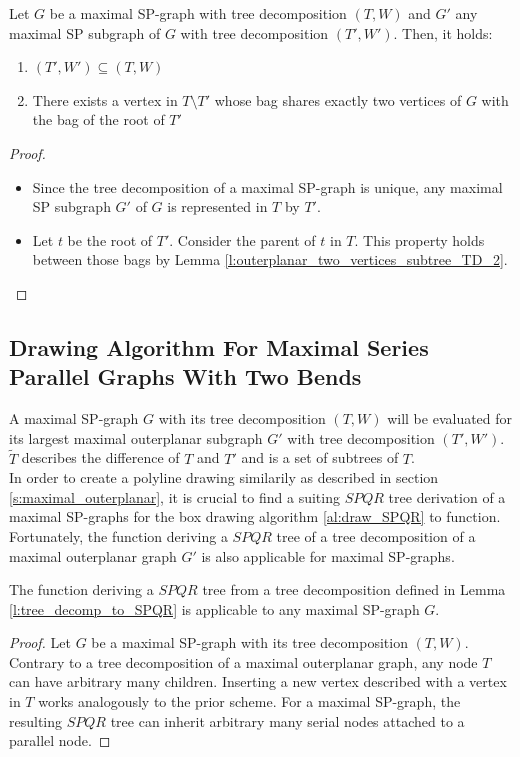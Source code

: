 \begin{lemma}
	Let $G$ be a maximal SP-graph with tree decomposition $(T,W)$ and $G'$ any maximal SP subgraph of $G$ with tree decomposition $(T',W')$. Then, it holds:
	\begin{enumerate}
		\item $(T',W') \subseteq (T,W)$
		\item There exists a vertex in $T\setminus T'$ whose bag shares exactly two vertices of $G$ with the bag of the root of $T'$
	\end{enumerate}
\end{lemma}	
\begin{proof}
	\begin{itemize}
		\item Since the tree decomposition of a maximal SP-graph is unique, any maximal SP subgraph $G'$ of $G$ is represented in $T$ by $T'$.
		\item Let $t$ be the root of $T'$. Consider the parent of $t$ in $T$. This property holds between those bags by Lemma \ref{l:outerplanar_two_vertices_subtree_TD_2}.
	\end{itemize}
\end{proof}


\subsection{Drawing Algorithm For Maximal Series Parallel Graphs With Two Bends}

A maximal SP-graph $G$ with its tree decomposition $(T,W)$ will be evaluated for its largest maximal outerplanar subgraph $G'$ with tree decomposition $(T',W')$. $\tilde{T}$ describes the difference of $T$ and $T'$ and is a set of subtrees of $T$.\\
In order to create a polyline drawing similarily as described in section \ref{s:maximal_outerplanar}, it is crucial to find a suiting $SPQR$ tree derivation of a maximal SP-graphs for the box drawing algorithm \ref{al:draw_SPQR} to function. Fortunately, the function deriving a $SPQR$ tree of a tree decomposition of a maximal outerplanar graph $G'$ is also applicable for maximal SP-graphs.
\begin{lemma}
	The function deriving a $SPQR$ tree from a tree decomposition defined in Lemma \ref{l:tree_decomp_to_SPQR} is applicable to any maximal SP-graph $G$.
\end{lemma}
\begin{proof}
	Let $G$ be a maximal SP-graph with its tree decomposition $(T,W)$. Contrary to a tree decomposition of a maximal outerplanar graph, any node $T$ can have arbitrary many children. Inserting a new vertex described with a vertex in $T$ works analogously to the prior scheme. For a maximal SP-graph, the resulting $SPQR$ tree can inherit arbitrary many serial nodes attached to a parallel node.
\end{proof}

